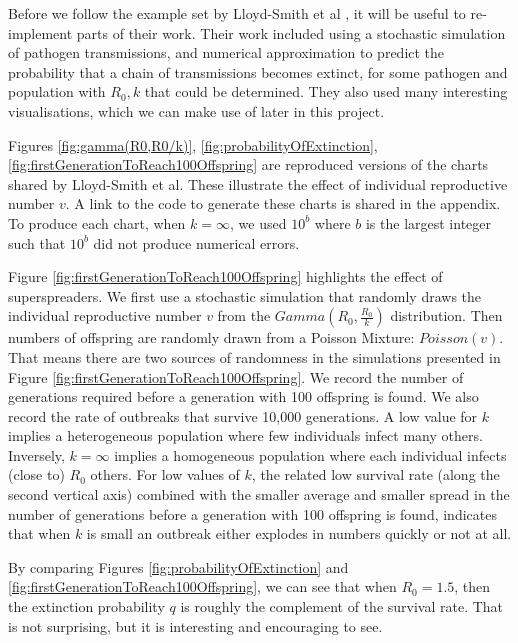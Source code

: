 \documentclass{article}
\begin{document}
Before we follow the example set by Lloyd-Smith et al \cite{LloydSmith2005}, it will be useful to re-implement parts of their work. Their work included using a stochastic simulation of pathogen transmissions, and numerical approximation to predict the probability that a chain of transmissions becomes extinct, for some pathogen and population with $ R_0, k $ that could be determined. They also used many interesting visualisations, which we can make use of later in this project.

Figures \ref{fig:gamma(R0,R0/k)}, \ref{fig:probabilityOfExtinction}, \ref{fig:firstGenerationToReach100Offspring} are reproduced versions of the charts shared by Lloyd-Smith et al. These illustrate the effect of individual reproductive number $ v $. A link to the code to generate these charts is shared in the appendix. To produce each chart, when $ k = \infty $, we used $ 10^b $ where $ b $ is the largest integer such that $ 10^b $ did not produce numerical errors.

Figure \ref{fig:firstGenerationToReach100Offspring} highlights the effect of superspreaders. We first use a stochastic simulation that randomly draws the individual reproductive number $ v $ from the $ Gamma\left(R_0, \frac{R_0}{k}\right) $ distribution. Then numbers of offspring are randomly drawn from a Poisson Mixture: $ Poisson(v) $. That means there are two sources of randomness in the simulations presented in Figure \ref{fig:firstGenerationToReach100Offspring}. We record the number of generations required before a generation with 100 offspring is found. We also record the rate of outbreaks that survive 10,000 generations. A low value for $ k $ implies a heterogeneous population where few individuals infect many others. Inversely, $ k = \infty $ implies a homogeneous population where each individual infects (close to) $ R_0 $ others. For low values of $ k $, the related low survival rate (along the second vertical axis) combined with the smaller average and smaller spread in the number of generations before a generation with 100 offspring is found, indicates that when $ k $ is small an outbreak either explodes in numbers quickly or not at all.

By comparing Figures \ref{fig:probabilityOfExtinction} and \ref{fig:firstGenerationToReach100Offspring}, we can see that when $ R_0=1.5 $, then the extinction probability $ q $ is roughly the complement of the survival rate. That is not surprising, but it is interesting and encouraging to see.
\end{document}
